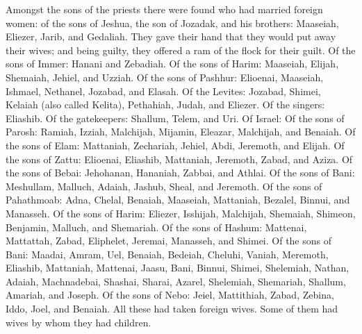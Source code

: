  Amongst the sons of the priests there were found who had
married foreign women: of the sons of Jeshua, the son of Jozadak, and
his brothers: Maaseiah, Eliezer, Jarib, and Gedaliah. 
They gave their hand that they would put away their wives; and being
guilty, they offered a ram of the flock for their guilt. 
Of the sons of Immer: Hanani and Zebadiah.  Of the sons
of Harim: Maaseiah, Elijah, Shemaiah, Jehiel, and Uzziah.
 Of the sons of Pashhur: Elioenai, Maaseiah, Ishmael,
Nethanel, Jozabad, and Elasah.  Of the Levites: Jozabad,
Shimei, Kelaiah (also called Kelita), Pethahiah, Judah, and Eliezer.
 Of the singers: Eliashib. Of the gatekeepers: Shallum,
Telem, and Uri.  Of Israel: Of the sons of Parosh:
Ramiah, Izziah, Malchijah, Mijamin, Eleazar, Malchijah, and Benaiah.
 Of the sons of Elam: Mattaniah, Zechariah, Jehiel, Abdi,
Jeremoth, and Elijah.  Of the sons of Zattu: Elioenai,
Eliashib, Mattaniah, Jeremoth, Zabad, and Aziza.  Of the
sons of Bebai: Jehohanan, Hananiah, Zabbai, and Athlai. 
Of the sons of Bani: Meshullam, Malluch, Adaiah, Jashub, Sheal, and
Jeremoth.  Of the sons of Pahathmoab: Adna, Chelal,
Benaiah, Maaseiah, Mattaniah, Bezalel, Binnui, and Manasseh.
 Of the sons of Harim: Eliezer, Isshijah, Malchijah,
Shemaiah, Shimeon,  Benjamin, Malluch, and Shemariah.
 Of the sons of Hashum: Mattenai, Mattattah, Zabad,
Eliphelet, Jeremai, Manasseh, and Shimei.  Of the sons of
Bani: Maadai, Amram, Uel,  Benaiah, Bedeiah, Cheluhi,
 Vaniah, Meremoth, Eliashib,  Mattaniah,
Mattenai, Jaasu,  Bani, Binnui, Shimei, 
Shelemiah, Nathan, Adaiah,  Machnadebai, Shashai, Sharai,
 Azarel, Shelemiah, Shemariah,  Shallum,
Amariah, and Joseph.  Of the sons of Nebo: Jeiel,
Mattithiah, Zabad, Zebina, Iddo, Joel, and Benaiah.  All
these had taken foreign wives. Some of them had wives by whom they had
children.
